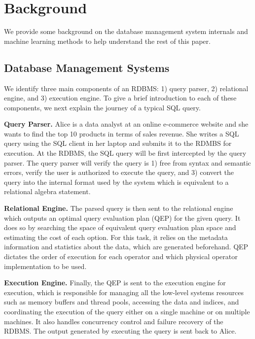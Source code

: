 \section{Background}
We provide some background on the database management system internals and machine learning methods to help understand the rest of this paper.

\subsection{Database Management Systems}
We identify three main components of an RDBMS: 1) query parser, 2) relational engine, and 3) execution engine.
To give a brief introduction to each of these components, we next explain the journey of a typical SQL query.

\vspace{2mm}
\noindent \textbf{Query Parser.} Alice is a data analyst at an online e-commerce website and she wants to find the top 10 products in terms of sales revenue.
She writes a SQL query using the SQL client in her laptop and submits it to the RDMBS for execution.
At the RDBMS, the SQL query will be first intercepted by the query parser.
The query parser will verify the query is 1) free from syntax and semantic errors, verify the user is authorized to execute the query, and 3) convert the query into the internal format used by the system which is equivalent to a relational algebra statement.

\vspace{2mm}
\noindent \textbf{Relational Engine.} The parsed query is then sent to the relational engine which outputs an optimal query evaluation plan (QEP) for the given query.
It does so by searching the space of equivalent query evaluation plan space and estimating the cost of each option.
For this task, it relies on the metadata information and statistics about the data, which are generated beforehand.
QEP dictates the order of execution for each operator and which physical operator implementation to be used.

\vspace{2mm}
\noindent \textbf{Execution Engine.} Finally, the QEP is sent to the execution engine for execution, which is responsible for managing all the low-level systems resources such as memory buffers and thread pools, accessing the data and indices, and coordinating the execution of the query either on a single machine or on multiple machines.
It also handles concurrency control and failure recovery of the RDBMS.
The output generated by executing the query is sent back to Alice.

